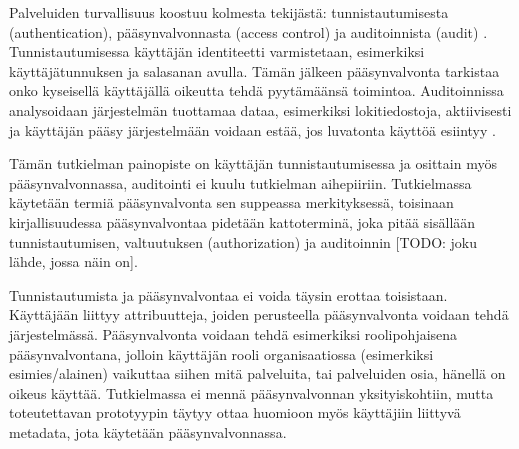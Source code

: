 Palveluiden turvallisuus koostuu kolmesta tekijästä: tunnistautumisesta (authentication), pääsynvalvonnasta (access control) ja auditoinnista (audit) \cite{sandhu}. Tunnistautumisessa käyttäjän identiteetti varmistetaan, esimerkiksi käyttäjätunnuksen ja salasanan avulla. Tämän jälkeen pääsynvalvonta tarkistaa onko kyseisellä käyttäjällä oikeutta tehdä pyytämäänsä toimintoa. Auditoinnissa analysoidaan järjestelmän tuottamaa dataa, esimerkiksi lokitiedostoja, aktiivisesti ja käyttäjän pääsy järjestelmään voidaan estää, jos luvatonta käyttöä esiintyy \cite{sandhu}.

Tämän tutkielman painopiste on käyttäjän tunnistautumisessa ja osittain myös pääsynvalvonnassa, auditointi ei kuulu tutkielman aihepiiriin. Tutkielmassa käytetään termiä pääsynvalvonta sen suppeassa merkityksessä, toisinaan kirjallisuudessa pääsynvalvontaa pidetään kattoterminä, joka pitää sisällään tunnistautumisen, valtuutuksen (authorization) ja auditoinnin [TODO: joku lähde, jossa näin on].

Tunnistautumista ja pääsynvalvontaa ei voida täysin erottaa toisistaan. Käyttäjään liittyy attribuutteja, joiden perusteella pääsynvalvonta voidaan tehdä järjestelmässä. Pääsynvalvonta voidaan tehdä esimerkiksi roolipohjaisena pääsynvalvontana, jolloin käyttäjän rooli organisaatiossa (esimerkiksi esimies/alainen) vaikuttaa siihen mitä palveluita, tai palveluiden osia, hänellä on oikeus käyttää. Tutkielmassa ei mennä pääsynvalvonnan yksityiskohtiin, mutta toteutettavan prototyypin täytyy ottaa huomioon myös käyttäjiin liittyvä metadata, jota käytetään pääsynvalvonnassa.